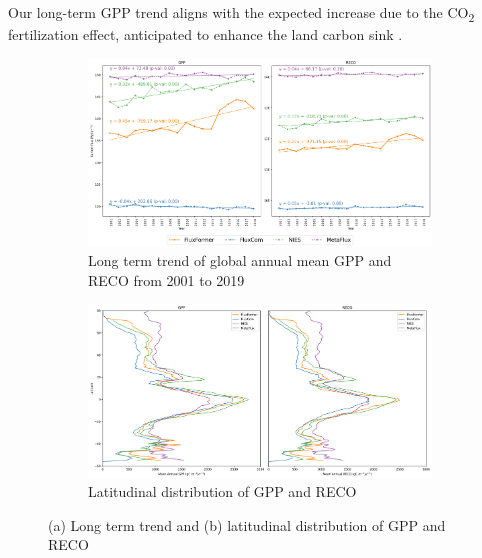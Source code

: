 Our long-term GPP trend aligns with the expected increase due to the CO\textsubscript{2} fertilization effect, anticipated to enhance the land carbon sink \citep{piao2020characteristics, guo2023estimating, yang2022divergent}.\par
\begin{figure}[tbh!]
    \centering
    \begin{subfigure}{\textwidth}
      \centering
      \includegraphics[width=\textwidth]{figs/chap6/global_annual_timeseries.png}
      \caption{Long term trend of global annual mean GPP and RECO from 2001 to 2019}
      \label{fig:chap6_fig7a}
    \end{subfigure}

    \begin{subfigure}{\textwidth}
      \centering
      \includegraphics[width=\textwidth]{figs/chap6/lat_mean.png}
      \caption{Latitudinal distribution of GPP and RECO}
      \label{fig:chap6_fig7b}
    \end{subfigure}
    \caption[Long term trend and latitudinal distribution of GPP and RECO]{ (a) Long term trend and (b) latitudinal distribution of GPP and RECO}
    \label{fig:chap6_fig7}
\end{figure}

